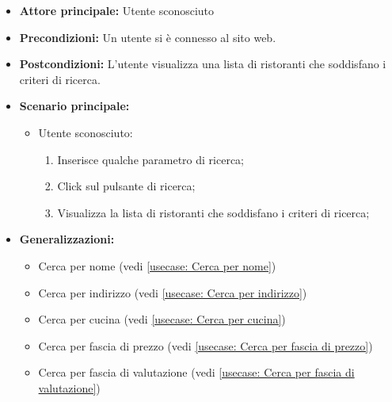 \label{usecase:Cerca ristoranti}
\begin{itemize}
	\item \textbf{Attore principale:}  Utente sconosciuto
	\item \textbf{Precondizioni:}
	      Un utente si è connesso al sito web.
	\item \textbf{Postcondizioni:}
	      L'utente visualizza una lista di ristoranti che soddisfano i criteri di ricerca.
	\item \textbf{Scenario principale:}
	      \begin{itemize}
		      \item  Utente sconosciuto:
		            \begin{enumerate}
			            \item Inserisce qualche parametro di ricerca;
			            \item Click sul pulsante di ricerca;
			            \item Visualizza la lista di ristoranti che soddisfano i criteri di ricerca;
		            \end{enumerate}
	      \end{itemize}
	\item \textbf{Generalizzazioni:}
	      \begin{itemize}
		      \item  Cerca per nome (vedi \autoref{usecase: Cerca per nome})
		      \item  Cerca per indirizzo (vedi \autoref{usecase: Cerca per indirizzo})
		      \item  Cerca per cucina (vedi \autoref{usecase: Cerca per cucina})
		      \item  Cerca per fascia di prezzo (vedi \autoref{usecase: Cerca per fascia di prezzo})
		      \item  Cerca per fascia di valutazione (vedi \autoref{usecase: Cerca per fascia di valutazione})
	      \end{itemize}

\end{itemize}
